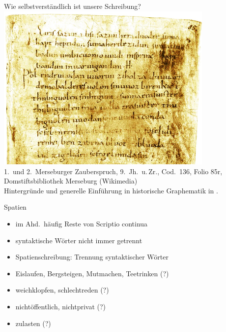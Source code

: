 \begin{frame}
  {Wie selbstverständlich ist unsere Schreibung?}
  \pause
  \centering
  \includegraphics[width=0.8\textwidth]{graphics/merseburg}\\[0.5\baselineskip]
  {\tiny 1.~und 2.~Merseburger Zauberspruch, 9.~Jh.\ u.\,Zr., Cod.\ 136, Folio 85r, Domstiftsbibliothek Merseburg (Wikimedia)\\[-1\baselineskip]
    Hintergründe und generelle Einführung in historische Graphematik in \citet{Elmentaler2018}.}
\end{frame}

\begin{frame}
  {Spatien}
  \pause
  \begin{itemize}[<+->]
    \item im Ahd.\ häufig Reste von Scriptio continua
    \item syntaktische Wörter nicht immer getrennt
    \item \alert{Spatienschreibung}: Trennung syntaktischer Wörter
  \end{itemize}
  \pause
  \Halbzeile
  \begin{exe}
    \ex
    \begin{xlist}
      \pause
    \end{xlist}
    \pause
    \Halbzeile
    \ex
    \begin{xlist}
      \pause
    \end{xlist}
  \end{exe}
  \pause
  \begin{itemize}[<+->]
    \item Eislaufen, Bergsteigen, Mutmachen, Teetrinken (?)
    \item weichklopfen, schlechtreden (?)
    \item nichtöffentlich, nichtprivat (?)
    \item zulasten (?)
  \end{itemize}
\end{frame}

